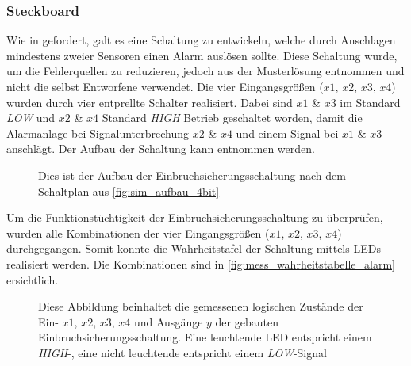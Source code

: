 \documentclass[12pt,english,ngerman]{scrartcl}
\begin{document}
\subsubsection{Steckboard}
Wie in  gefordert, galt es eine Schaltung
zu entwickeln, welche durch Anschlagen mindestens zweier Sensoren einen Alarm auslösen
sollte. Diese Schaltung wurde, um die Fehlerquellen zu reduzieren, jedoch aus der
Musterlösung entnommen und nicht die selbst Entworfene verwendet. Die vier
Eingangsgrößen ($x1$, $x2$, $x3$, $x4$) wurden durch vier entprellte
Schalter realisiert. Dabei sind $x1$ \& $x3$ im Standard \textit{LOW} und
$x2$ \& $x4$ Standard \textit{HIGH} Betrieb geschaltet worden, damit die
Alarmanlage bei Signalunterbrechung $x2$ \& $x4$ und einem Signal bei $x1$
\& $x3$ anschlägt. Der Aufbau der Schaltung kann 
entnommen werden.

\begin{figure}[H]
  \centering
  \caption{Dies ist der Aufbau der Einbruchsicherungsschaltung nach dem
  Schaltplan aus \autoref{fig:sim_aufbau_4bit}}
  \label{fig:mess_aufbau_alarm}
\end{figure}

Um die Funktionstüchtigkeit der Einbruchsicherungsschaltung zu überprüfen,
wurden alle Kombinationen der vier Eingangsgrößen ($x1$, $x2$, $x3$, $x4$)
durchgegangen. Somit konnte die Wahrheitstafel der Schaltung mittels LEDs realisiert werden.
Die Kombinationen sind in \autoref{fig:mess_wahrheitstabelle_alarm}
ersichtlich.

\begin{figure}[H]
  \centering
  \caption{Diese Abbildung beinhaltet die gemessenen logischen Zustände der
    Ein- $x1$, $x2$, $x3$, $x4$ und Ausgänge $y$ der gebauten
    Einbruchsicherungsschaltung. Eine leuchtende LED entspricht einem
    \textit{HIGH}-, eine nicht leuchtende entspricht einem \textit{LOW}-Signal}
  \label{fig:mess_wahrheitstabelle_alarm}
\end{figure}
\end{document}
